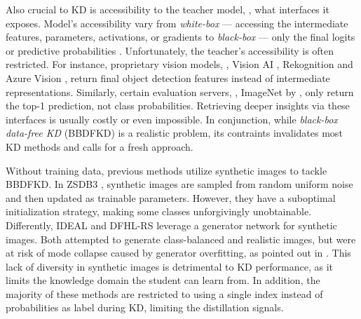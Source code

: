 \begin{foldable} %
    Also crucial to KD is accessibility to the teacher model, \ie, what interfaces it exposes.
    Model's accessibility vary from \textit{white-box} --- accessing the intermediate features, parameters, activations, or gradients \citep{romero2015fitnets, yim2017gift, chen2019data} to \textit{black-box} --- only the final logits or predictive probabilities \citep{wang2020neural, nguyen2022black, vo2024improving}.
    Unfortunately, the teacher's accessibility is often restricted.
    For instance, proprietary vision models, \eg, Vision AI \citep{google-visionai}, Rekognition \citep{aws-rekognition} and Azure Vision \citep{azure-vision}, return final object detection features instead of intermediate representations.
    Similarly, certain evaluation servers, \eg, ImageNet by \citet{russakovsky2015imagenet}, only return the top-1 prediction, not class probabilities.
    Retrieving deeper insights via these interfaces is usually costly or even impossible.
    In conjunction, while \textit{black-box data-free KD} (BBDFKD) is a realistic problem, its contraints invalidates most KD methods and calls for a fresh approach.
\end{foldable}

\begin{foldable} %
    Without training data, previous methods utilize synthetic images to tackle BBDFKD.
    In ZSDB3 \citep{wang2021zero}, synthetic images are sampled from random uniform noise and then updated as trainable parameters.
    However, they have a suboptimal initialization strategy, making some classes unforgivingly unobtainable.
    Differently, IDEAL \citep{zhang2022ideal} and DFHL-RS \citep{yuan2024data} leverage a generator network for synthetic images.
    Both attempted to generate class-balanced and realistic images, but were at risk of mode collapse caused by generator overfitting, as pointed out in \citet{yuan2024data}.
    This lack of diversity in synthetic images is detrimental to KD performance, as it limits the knowledge domain the student can learn from.
    In addition, the majority of these methods are restricted to using a single index instead of probabilities as label during KD, limiting the distillation signals.
\end{foldable}

